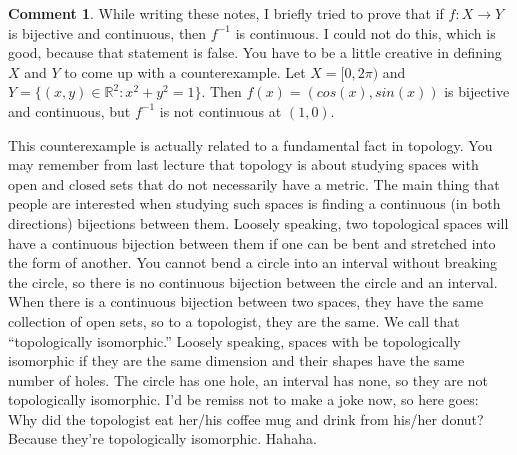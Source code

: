 \documentclass[12pt,reqno]{amsart}
\theoremstyle{definition}
\newtheorem{remark}{Comment}[section]
\def\R{\mathbb{R}}
\renewcommand{\to}{{\rightarrow}}
\begin{document}
\begin{remark}
  While writing these notes, I briefly tried to prove that if $f:X \to
  Y$ is bijective and continuous, then $f^{-1}$ is continuous. I could
  not do this, which is good, because that statement is false. You have
  to be a little creative in defining $X$ and $Y$ to come up with a
  counterexample. Let $X = [0,2\pi)$ and $Y = \{(x,y) \in \R^2: x^2 +
  y^2 = 1 \}$. Then $f(x) = (cos(x), sin(x))$ is bijective and
  continuous, but $f^{-1}$ is not continuous at $(1,0)$. 
  
  This counterexample is actually related to a fundamental fact in
  topology. You may remember from last lecture that topology is about
  studying spaces with open and closed sets that do not necessarily
  have a metric. The main thing that people are interested when
  studying such spaces is finding a continuous (in both directions)
  bijections between them. Loosely speaking, two topological spaces
  will have a continuous bijection between them if one can be bent and
  stretched into the form of another. You cannot bend a circle into an
  interval without breaking the circle, so there is no continuous
  bijection between the circle and an interval. When there is a
  continuous bijection between two spaces, they have the same
  collection of open sets, so to a topologist, they are the same. We
  call that ``topologically isomorphic.'' Loosely speaking, spaces
  with be topologically isomorphic if they are the same dimension and
  their shapes have the same number of holes.  The circle has one
  hole, an interval has none, so they are not topologically
  isomorphic. I'd be remiss not to make a joke now, so here goes: Why did
  the topologist eat her/his coffee mug and drink from his/her donut?
  Because they're topologically isomorphic. Hahaha.
\end{remark}
\end{document}
